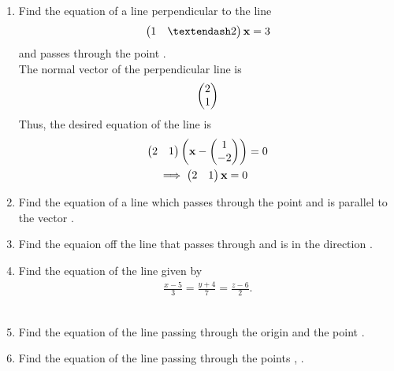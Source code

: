 \documentclass[journal,12pt,twocolumn]{IEEEtran}
\renewcommand\thesection{\arabic{section}}
\begin{document}
\begin{enumerate}[label=\thesection.\arabic*.,ref=\thesection.\theenumi]
%
%
\item Find the equation of a line perpendicular to the line 
\begin{align}
\myvec{1 & – 2}\vec{x}  = 3
\end{align}
%
and passes through the point .
%
\\
\solution The normal vector of the perpendicular line is 
%
\begin{align}
\begin{pmatrix}2 \\ 1\end{pmatrix}
\end{align}
%
Thus, the desired equation of the line is 
%
\begin{align}
\begin{pmatrix}2 & 1\end{pmatrix}\left(\mathbf{x} - \begin{pmatrix}1\\-2\end{pmatrix}\right) &=0
\\
\implies \begin{pmatrix}2 & 1\end{pmatrix}\mathbf{x} =0
\end{align}
%
\item Find the equation of a line which passes through the point  and is parallel to the vector .
\\
\solution
%
\item Find the equaion off the line that passes through  and is in the direction .
\\
\solution
%
\item Find the equation of the line given by 
\begin{align}
\frac{x-5}{3} = \frac{y+4}{7} = \frac{z-6}{2}. 
\end{align}
\\
\solution
%
\item Find the equation of the line passing through the origin and the point .
\\
\solution
%
\item Find the equation of the line passing through the points , .\\

\end{enumerate}
\end{document}
